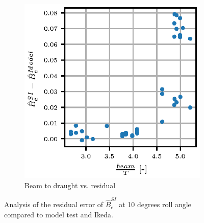 \begin{figure}[H]
\begin{subfigure}[b]{0.4\textwidth}
        \includegraphics[width=\textwidth]{figures/beam_T_residual.eps}
        \caption{Beam to draught vs. residual}
        \label{fig:beam_T_residual}
    \end{subfigure}
    
    \caption{Analysis of the residual error of $\hat{B}_e^{SI}$ at 10 degrees roll angle compared to model test and Ikeda.}\label{fig:validation}
\end{figure}



